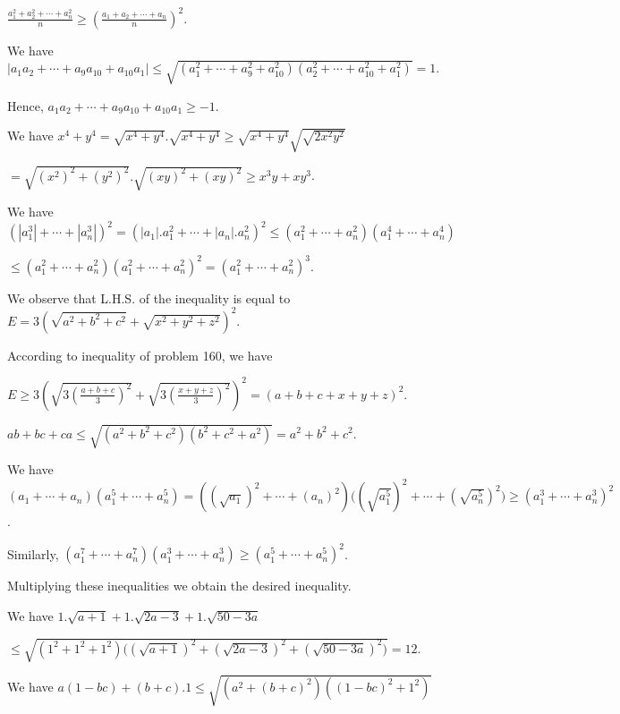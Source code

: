   $\frac{a_1^2 + a_2^2 + \cdots + a_n^2}{n}\geq \left(\frac{a_1 + a_2 + \cdots + a_n}{n}\right)^2$.
\item We have $|a_1a_2 + \cdots + a_9a_{10} + a_{10}a_1|\leq \sqrt{\left(a_1^2 + \cdots + a_9^2 +
  a_{10}^2\right)\left(a_2^2 + \cdots + a_{10}^2 + a_1^2\right)} = 1$.

  Hence, $a_1a_2 + \cdots + a_9a_{10} + a_{10}a_1\geq -1$.
\item We have $x^4 + y^4 = \sqrt{x^4 + y^4}.\sqrt{x^4 + y^4}\geq \sqrt{x^4 + y^4}\sqrt{\sqrt{2x^2y^2}}$

  $= \sqrt{(x^2)^2 + (y^2)^2}.\sqrt{(xy)^2 + (xy)^2}\geq x^3y + xy^3$.
\item We have $\left(|a_1^3| + \cdots + |a_n^3|\right)^2 = \left(|a_1|.a_1^2 + \cdots + |a_n|.a_n^2\right)^2
  \leq \left(a_1^2 + \cdots + a_n^2\right)\left(a_1^4 + \cdots + a_n^4\right)$

  $\leq \left(a_1^2 + \cdots + a_n^2\right)\left(a_1^2 + \cdots + a_n^2\right)^2 = \left(a_1^2 + \cdots +
  a_n^2\right)^3$.
\item We observe that L.H.S. of the inequality is equal to $E = 3\left(\sqrt{a^2 + b^2 + c^2} + \sqrt{x^2 +
  y^2 + z^2}\right)^2$.

  According to inequality of problem 160, we have

  $E\geq 3\left(\sqrt{3\left(\frac{a + b + c}{3}\right)^2} + \sqrt{3\left(\frac{x + y +
      z}{3}\right)^2}\right)^2 = (a + b + c + x + y + z)^2$.
\item $ab + bc + ca\leq \sqrt{\left(a^2 + b^2 + c^2\right)\left(b^2 + c^2 + a^2\right)} = a^2 + b^2 + c^2$.
\item We have $(a_1 + \cdots + a_n)\left(a_1^5 + \cdots + a_n^5\right) = \left(\left(\sqrt{a_1}\right)^2
  + \cdots + \left(a_n\right)^2\right)\bigl(\left(\sqrt{a_1^5}\right)^2 + \cdots
  + \left(\sqrt{a_n^5}\right)^2\bigr)\geq \left(a_1^3 + \cdots + a_n^3\right)^2$.

  Similarly, $\left(a_1^7 + \cdots + a_n^7\right)\left(a_1^3 + \cdots + a_n^3\right)\geq \left(a_1^5
  + \cdots + a_n^5\right)^2$.

  Multiplying these inequalities we obtain the desired inequality.
\item We have $1.\sqrt{a + 1} + 1.\sqrt{2a - 3} + 1.\sqrt{50 - 3a}$

  $\leq\sqrt{\left(1^2 + 1^2 +
  1^2\right)\bigl(\left(\sqrt{a + 1}\right)^2 + \left(\sqrt{2a - 3}\right)^2 + \left(\sqrt{50 -
    3a}\right)^2\bigr)} = 12$.
\item We have $a(1 - bc) + (b + c).1\leq \sqrt{\left(a^2 + \left(b + c\right)^2\right)\left(\left(1 -
  bc\right)^2 + 1^2\right)}$

